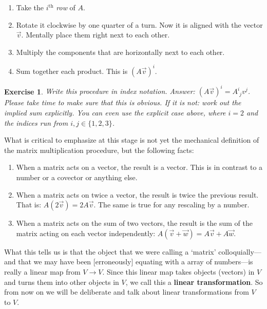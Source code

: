 \documentclass[
  11pt,
	colorful,
	raggedright,
]{tufte-style-thesis-flip}
\newtheorem{exercise}{Exercise}[section]
\newcommand{\aij}[2]{^{#1}_{\phantom{#1}#2}}
\begin{document}
\begin{enumerate}
  \item Take the $i^\text{th}$ \emph{row} of $A$.
  \item Rotate it clockwise by one quarter of a turn. Now it is aligned with the vector $\vec{v}$. Mentally place them right next to each other.
  \item Multiply the components that are horizontally next to each other.
  \item Sum together each product. This is $(A\vec{v})^i$.
\end{enumerate}
\begin{exercise}
Write this procedure in index notation. {Answer}: $(A\vec{v})^i = A\aij{i}{j}v^j$. Please take time to make sure that this is obvious. If it is not: work out the implied sum explicitly. You can even use the explicit case above, where $i=2$ and the indices run from $i,j \in \{1,2,3\}$. 
\end{exercise}

What is critical to emphasize at this stage is not yet the mechanical definition of the matrix multiplication procedure, but the following facts:
\begin{enumerate}
  \item When a matrix acts on a vector, the result is a vector. This is in contrast to a number or a covector or anything else. 
  \item When a matrix acts on twice a vector, the result is twice the previous result. That is: $A(2\vec{v}) = 2A\vec{v}$. The same is true for any rescaling by a number.
  \item When a matrix acts on the sum of two vectors, the result is the sum of the matrix acting on each vector independently: $A(\vec{v}+\vec{w}) = A\vec{v}+A\vec{w}$.
\end{enumerate}
What this tells us is that the object that we were calling a `matrix' colloquially---and that we may have been [erroneously] equating with a  array of numbers---is really a linear map from $V\to V$. Since this linear map takes objects (vectors) in $V$ and turns them into other objects in $V$, we call this a \textbf{linear transformation}. 
%
So from now on we will be deliberate and talk about linear transformations from $V$ to $V$.
\end{document}
